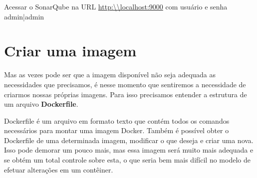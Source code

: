 \documentclass[a4paper,11pt]{article}
\begin{document}
Acessar o SonarQube na URL \url{http:\\localhost:9000} com usuário e senha admin|admin

\section{Criar uma imagem}
Mas as vezes pode ser que a imagem disponível não seja adequada as necessidades que precisamos, é nesse momento que sentiremos a necessidade de criarmos nossas próprias imagens. Para isso precisamos entender a estrutura de um arquivo \textbf{Dockerfile}.

Dockerfile é um arquivo em formato texto que contém todos os comandos necessários para montar uma imagem Docker. Também é possível obter o Dockerfile de uma determinada imagem, modificar o que deseja e criar uma nova. Isso pode demorar um pouco mais, mas essa imagem será muito mais adequada e se obtém um total controle sobre esta, o que seria bem mais difícil no modelo de efetuar alterações em um contêiner.
\end{document}
